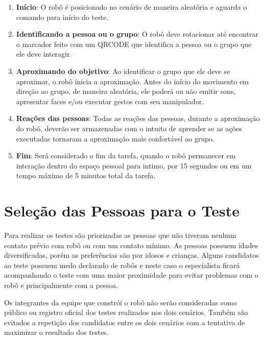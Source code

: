 \begin{enumerate}
	\item \textbf{Início}: O robô é posicionado no cenário de maneira aleatória e aguarda o comando para início do teste.
	\item \textbf{Identificando a pessoa ou o grupo}: O robô deve rotacionar até encontrar o marcador feito com um QRCODE que identifica a pessoa ou o grupo que ele deve interagir.
	\item \textbf{Aproximando do objetivo}: Ao identificar o grupo que ele deve se aproximar, o robô inicia a aproximação. Antes do início do movimento em direção ao grupo, de maneira aleatória, ele poderá ou não emitir sons, apresentar faces e/ou executar gestos com seu manipulador.
	\item \textbf{Reações das pessoas}: Todas as reações das pessoas, durante a aproximação do robô, deverão ser armazenadas com o intuito de aprender se as ações executadas tornaram a aproximação mais confortável ao grupo.
	\item \textbf{Fim}: Será considerado o fim da tarefa, quando o robô permanecer em interação dentro do espaço pessoal para intimo, por 15 segundos ou em um tempo máximo de 5 minutos total da tarefa.
\end{enumerate}

\section{Seleção das Pessoas para o Teste}
\label{sec:perfistestes}
Para realizar os testes são priorizadas as pessoas que não tiveram nenhum contato prévio com robô ou com um contato mínimo. As pessoas possuem idades diversificadas, porém as preferências são por idosos e crianças. Alguns candidatos ao teste possuem medo declarado de robôs e neste caso o especialista ficará acompanhando o teste com uma maior proximidade para evitar problemas com o robô e principalmente com a pessoa.

Os integrantes da equipe que constrói o robô não serão consideradas como público ou registro oficial dos testes realizados nos dois cenários. Também são evitados a repetição dos candidatos entre os dois cenários com a tentativa de maximizar o resultado dos testes.
